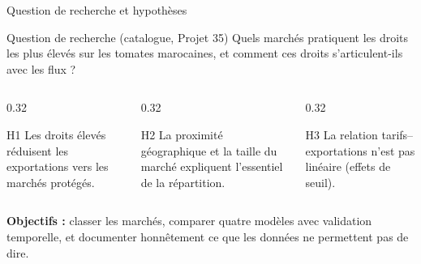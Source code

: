 \documentclass[aspectratio=169,10pt]{beamer}
\begin{document}
\begin{frame}{Question de recherche et hypothèses}
  \begin{block}{Question de recherche (catalogue, Projet 35)}
    Quels marchés pratiquent les droits les plus élevés sur les tomates
    marocaines, et comment ces droits s'articulent-ils avec les flux ?
  \end{block}
  \vspace{0.6em}
  \begin{columns}[T,onlytextwidth]
    \begin{column}{0.32\textwidth}
      \begin{block}{H1}
        Les droits élevés réduisent les exportations vers les marchés
        protégés.
      \end{block}
    \end{column}
    \begin{column}{0.32\textwidth}
      \begin{block}{H2}
        La proximité géographique et la taille du marché expliquent
        l'essentiel de la répartition.
      \end{block}
    \end{column}
    \begin{column}{0.32\textwidth}
      \begin{block}{H3}
        La relation tarifs--exportations n'est pas linéaire
        (effets de seuil).
      \end{block}
    \end{column}
  \end{columns}
  \vspace{0.6em}
  \textbf{Objectifs :} classer les marchés, comparer quatre modèles avec
  validation temporelle, et documenter honnêtement ce que les données ne
  permettent pas de dire.
\end{frame}
\end{document}
